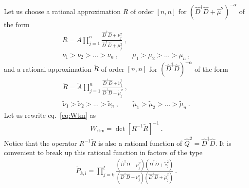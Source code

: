 \documentclass[11pt,fleqn]{article}
\newcommand{\Rmu}{R}
\newcommand{\R}{\tilde{R}}
\begin{document}
Let us choose a rational approximation $\Rmu$ of order $[n,n]$ for $(\hat{D}^\dag \hat{D} + \hat{\mu}^2)^{-\alpha}$ of the form
\begin{gather}
   \Rmu =
   A \prod_{j=1}^n \frac{\hat{D}^\dag \hat{D} + \nu_j^2}{\hat{D}^\dag \hat{D} + \mu_j^2}
   \ , \\
   \nu_1 > \nu_2 > \dots > \nu_n \ , \qquad
   \mu_1 > \mu_2 > \dots > \mu_n \ ,
\end{gather}
and a rational approximation $\R$ of order $[n,n]$ for $(\hat{D}^\dag \hat{D})^{-\alpha}$ of the form
\begin{gather}
   \R =
   \tilde{A} \prod_{j=1}^n \frac{\hat{D}^\dag \hat{D} + \tilde{\nu}_j^2}{\hat{D}^\dag \hat{D} + \tilde{\mu}_j^2}
   \ , \\
   \tilde{\nu}_1 > \tilde{\nu}_2 > \dots > \tilde{\nu}_n \ , \qquad
   \tilde{\mu}_1 > \tilde{\mu}_2 > \dots > \tilde{\mu}_n \ .
\end{gather}
Let us rewrite eq.~\eqref{eq:Wtm} as
\begin{gather}
   W_\text{rtm} = \det [ \Rmu^{-1} \R ]^{-1} \ .
\end{gather}
Notice that the operator $\Rmu^{-1} \R$ is also a rational function of $\hat{Q}^2=\hat{D}^\dag \hat{D}$. It is convenient to break up this rational function in factors of the type
\begin{gather}
   \tilde{P}_{k,l} = \prod_{j=k}^l \frac{(\hat{D}^\dag \hat{D} + \mu_j^2)(\hat{D}^\dag \hat{D} + \tilde{\nu}_j^2)}{(\hat{D}^\dag \hat{D} + \nu_j^2)(\hat{D}^\dag \hat{D} + \tilde{\mu}_j^2)} \ .
\end{gather}
\end{document}
